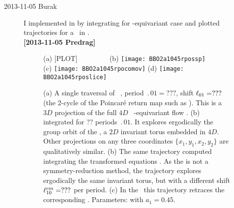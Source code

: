 \begin{description}
\item[2013-11-05 Burak] I implemented in {\mconn}  by integrating 
for -equivariant case and plotted trajectories for a \rpo\ in .
\\
{\bf [2013-11-05 Predrag]} 

\begin{figure}%
\centering
 (a) [PLOT] $~~~~~~~~~~~~~~~~~~$
 (b) \texttt{[image: BBO2a1045rpossp]}
 \\
 (c) \texttt{[image: BBO2a1045rpocomov]}
 (d) \texttt{[image: BBO2a1045rposlice]}
\caption{
(a) A single traversal of \rpo\ , period $\period{01}=???$,
shift $\ell_{01}=???$ (the 2-cycle of the Poincar\'e return map
such as ). This is a $3D$ projection of the
full $4D$ \statesp\ -equivariant {\twoMode} flow
.
(b) \Rpo\  integrated for  ?? periods $\period{01}$. It
explores ergodically the group orbit of the \rpo, a $2D$ invariant
torus embedded in $4D$. Other projections on any three coordinates
$\{x_1,y_1,x_2,y_2\}$ are qualitatively similar.
(b) The same trajectory computed integrating the {\comovframe}
transformed equations . As the {\mconn} is not a
symmetry-reduction method, the trajectory explores ergodically the
same invariant torus, but with a different shift $\ell_{10}^{cm}=???$
per period.
(c)  In the \slice\ this trajectory retraces the corresponding \po.
Parameters:  with $a_1 = 0.45$.
}
\label{fig:BBO2RpoSspComovSlice}
\end{figure}



\end{description}

